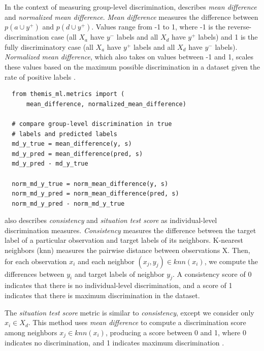 \documentclass{acm_proc_article-sp}
\begin{document}
In the context of measuring group-level discrimination,
\cite{zliobaite2015survey} describes \emph{mean difference} and \emph{normalized
mean difference}. \emph{Mean difference} measures the difference between \(p(a
\cup y^{+})\) and \(p(d \cup y^{+})\). Values range from -1 to 1, where -1 is
the reverse-discrimination case (all \(X_a\) have \(y^{-}\) labels and all
\(X_d\) have \(y^{+}\) labels) and 1 is the fully discriminatory case
(all \(X_a\) have \(y^{+}\) labels and all \(X_d\) have \(y^{-}\) labels).
\emph{Normalized mean difference}, which also takes on values between -1 and 1,
scales these values based on the maximum possible discrimination in a dataset
given the rate of positive labels \cite{zliobaite2015survey}.

\begin{verbatim}
  from themis_ml.metrics import (
      mean_difference, normalized_mean_difference)

  # compare group-level discrimination in true
  # labels and predicted labels
  md_y_true = mean_difference(y, s)
  md_y_pred = mean_difference(pred, s)
  md_y_pred - md_y_true

  norm_md_y_true = norm_mean_difference(y, s)
  norm_md_y_pred = norm_mean_difference(pred, s)
  norm_md_y_pred - norm_md_y_true
\end{verbatim}

\cite{zliobaite2015survey} also describes \emph{consistency} and \emph{situation
test score} as individual-level discrimination measures. \emph{Consistency}
measures the difference between the target label of a particular observation and
target labels of its neighbors. K-nearest neighbors (knn) measures the pairwise
distance between observations X. Then, for each observation \(x_i\) and each
neighbor \((x_j, y_j) \in knn(x_i)\), we compute the differences between \(y_i\)
and target labels of neighbor \(y_j\). A consistency score of 0 indicates that
there is no individual-level discrimination, and a score of 1 indicates that
there is maximum discrimination in the dataset.

The \emph{situation test score} metric is similar to \emph{consistency}, except
we consider only \(x_i \in X_d\). This method uses \emph{mean difference} to
compute a discrimination score among neighbors \(x_j \in knn(x_i)\), producing a
score between 0 and 1, where 0 indicates no discrimination, and 1 indicates
maximum discrimination \cite{zliobaite2015survey}.
\end{document}
